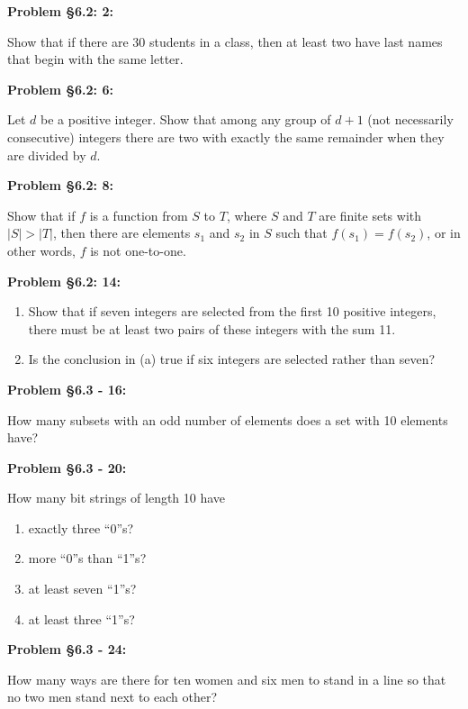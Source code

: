 \documentclass{article}
\newenvironment{problem}[1]
    {\begin{mdframed}[default]
    \textbf{Problem #1:}
    }
    {\end{mdframed}
    }
\begin{document}
\begin{problem}{\S 6.2: 2}
Show that if there are 30 students in a class, then at least two have last names that begin with the same letter.
\end{problem}

\begin{problem}{\S 6.2: 6}
Let $d$ be a positive integer. Show that among any group of $d+1$ (not necessarily consecutive) integers there are two with exactly the same remainder when they are divided by $d$.
\end{problem}

\begin{problem}{\S 6.2: 8}
Show that if $f$ is a function from $S$ to $T$, where $S$ and $T$ are finite sets with $|S| > |T|$, then there are elements $s_1$ and $s_2$ in $S$ such that $f(s_1) = f(s_2)$, or in other words, $f$ is not one-to-one.
\end{problem}

\begin{problem}{\S 6.2: 14}
\begin{enumerate}
    \item[(a)] Show that if seven integers are selected from the first 10 positive integers, there must be at least two pairs of these integers with the sum 11.
    \item[(b)] Is the conclusion in (a) true if six integers are selected rather than seven?
\end{enumerate}
\end{problem}

\begin{problem}{\S 6.3 - 16}
How many subsets with an odd number of elements does a set with 10 elements have?
\end{problem}

\begin{problem}{\S 6.3 - 20}
How many bit strings of length 10 have
\begin{enumerate}
    \item[(a)] exactly three ``0''s?
    \item[(b)] more ``0''s than ``1''s?
    \item[(c)] at least seven ``1''s?
    \item[(d)] at least three ``1''s?
\end{enumerate}
\end{problem}

\begin{problem}{\S 6.3 - 24}
How many ways are there for ten women and six men to stand in a line so that no two men stand next to each other?
\end{problem}
\end{document}
